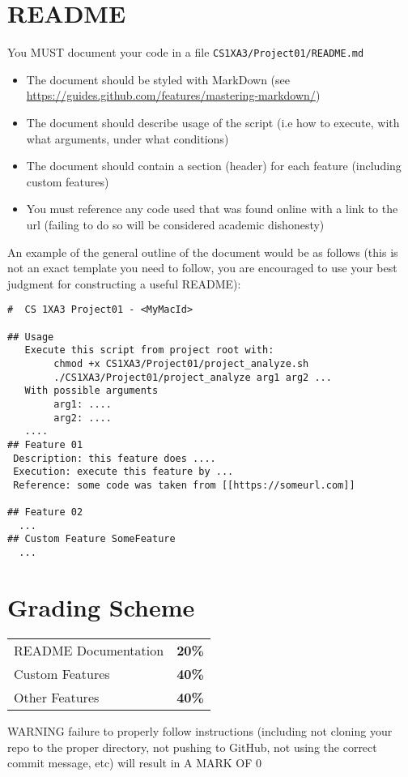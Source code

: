 \documentclass{article}
\begin{document}
\newpage

\section{README}
\label{sec:orgcf154f9}
You {\color{purple}MUST} document your code in a file \texttt{CS1XA3/Project01/README.md}
\begin{itemize}
\item The document should be styled with {\color{purple}MarkDown} (see
{\color{cyan}\url{https://guides.github.com/features/mastering-markdown/}})
\item The document should describe usage of the script (i.e how to execute, with what arguments, under what conditions)
\item The document should contain a section (header) for each feature (including custom features)
\item You must reference any code used that was found online with a link to the
url (failing to do so will be considered academic dishonesty)
\end{itemize}
An example of the general outline of the document would be as follows (this is
not an exact template you need to follow, you are encouraged to use your best
judgment for constructing a useful README):


\begin{verbatim}
#  CS 1XA3 Project01 - <MyMacId>

## Usage
   Execute this script from project root with:
        chmod +x CS1XA3/Project01/project_analyze.sh
        ./CS1XA3/Project01/project_analyze arg1 arg2 ...
   With possible arguments
        arg1: ....
        arg2: ....
   ....
## Feature 01
 Description: this feature does ....
 Execution: execute this feature by ...
 Reference: some code was taken from [[https://someurl.com]]

## Feature 02
  ...
## Custom Feature SomeFeature
  ...
\end{verbatim}

\newpage

\section{Grading Scheme}
\label{sec:org30a98f7}
\begin{center}
\begin{tabular}{ll}
README Documentation & \textbf{20\%}\\
Custom Features & \textbf{40\%}\\
Other Features & \textbf{40\%}\\
\end{tabular}
\end{center}
{\color{red}WARNING} failure to properly follow instructions (including not cloning
 your repo to the proper directory, not pushing to GitHub, not using the
 correct commit message, etc) will result in {\color{purple}A MARK OF 0}
\end{document}
